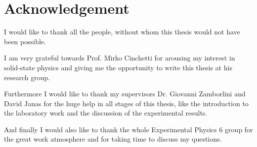 \section*{Acknowledgement}
I would like to thank all the people, without whom this thesis would not have been possible.
%

I am very grateful towards Prof. Mirko Cinchetti for arousing my interest in solid-state physics
and giving me the opportunity to write this thesis at his research group.

%
Furthermore I would like to thank my supervisors Dr. Giovanni Zamborlini and David Janas
for the huge help in all stages of this thesis, like the introduction
to the laboratory work and the discussion of the experimental results.

And finally I would also like to thank the whole
Experimental Physics 6 group for the great 
work atmosphere and for taking time
to discuss my questions.